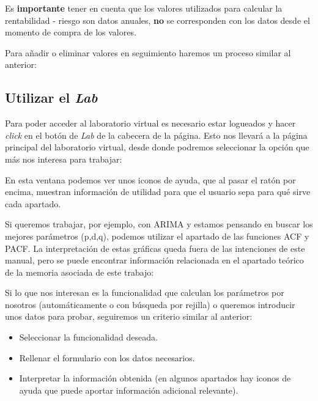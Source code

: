 
Es \textbf{importante} tener en cuenta que los valores utilizados para calcular la rentabilidad - riesgo son datos anuales, \textbf{no} se corresponden con los datos desde el momento de compra de los valores.


Para añadir o eliminar valores en seguimiento haremos un proceso similar al anterior:


\newpage
\subsection{Utilizar el \emph{Lab}}

Para poder acceder al laboratorio virtual es necesario estar logueados y hacer \emph{click} en el botón de \emph{Lab} de la cabecera de la página. Esto nos llevará a la página principal del laboratorio virtual, desde donde podremos seleccionar la opción que más nos interesa para trabajar:


En esta ventana podemos ver unos iconos de ayuda, que al pasar el ratón por encima, muestran información de utilidad para que el usuario sepa para qué sirve cada apartado. 

Si queremos trabajar, por ejemplo, con ARIMA y estamos pensando en buscar los mejores parámetros (p,d,q), podemos utilizar el apartado de las funciones ACF y PACF. La interpretación de estas gráficas queda fuera de las intenciones de este manual, pero se puede encontrar información relacionada en el apartado teórico de la memoria asociada de este trabajo:


Si lo que nos interesan es la funcionalidad que calculan los parámetros por nosotros (automáticamente o con búsqueda por rejilla) o queremos introducir unos datos para probar, seguiremos un criterio similar al anterior: 

\begin{itemize}
\item
Seleccionar la funcionalidad deseada.
\item
Rellenar el formulario con los datos necesarios. 
\item
Interpretar la información obtenida (en algunos apartados hay iconos de ayuda que puede aportar información adicional relevante).
\end{itemize}


